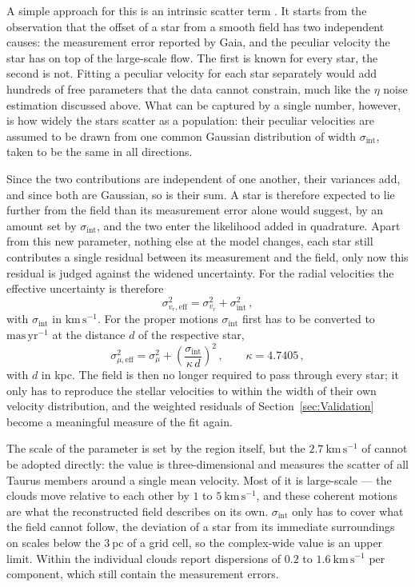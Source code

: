 A simple approach for this is an intrinsic scatter term \citep[Sect.~8]{Hogg2010}. It starts from
the observation that the offset of a star from a smooth field has two independent causes: the
measurement error reported by Gaia, and the peculiar velocity the star has on top of the
large-scale flow. The first is known for every star, the second is not. Fitting a peculiar velocity
for each star separately would add hundreds of free parameters that the data cannot constrain, much
like the $\eta$ noise estimation discussed above. What can be captured by a single number, however,
is how widely the stars scatter as a population: their peculiar velocities are assumed to be drawn
from one common Gaussian distribution of width $\sigma_\mathrm{int}$, taken to be the same in all
directions.

Since the two contributions are independent of one another, their variances add, and since both are
Gaussian, so is their sum. A star is therefore expected to lie further from the field than its
measurement error alone would suggest, by an amount set by $\sigma_\mathrm{int}$, and the two enter
the likelihood added in quadrature. Apart from this new parameter, nothing else at the model changes,
each star still contributes a single residual between its measurement and the field, only now this
residual is judged against the widened uncertainty. For the radial velocities the effective uncertainty
is therefore
\begin{equation}
    \sigma_{v_r,\mathrm{eff}}^2 = \sigma_{v_r}^2 + \sigma_\mathrm{int}^2 \, ,
    \label{eq:sigma_eff_rv}
\end{equation}
with $\sigma_\mathrm{int}$ in $\mathrm{km\,s^{-1}}$. For the proper motions $\sigma_\mathrm{int}$ first
has to be converted to $\mathrm{mas\,yr^{-1}}$ at the distance $d$ of the respective star,
\begin{equation}
    \sigma_{\mu,\mathrm{eff}}^2 = \sigma_{\mu}^2
    + \left( \frac{\sigma_\mathrm{int}}{\kappa\,d} \right)^{2} \, ,
    \qquad \kappa = 4.7405 \, ,
    \label{eq:sigma_eff_pm}
\end{equation}
with $d$ in kpc. The field is then no longer required to pass through every star; it only has to
reproduce the stellar velocities to within the width of their own velocity distribution, and the
weighted residuals of Section~\ref{sec:Validation} become a meaningful measure of the fit again.

The scale of the parameter is set by the region itself, but the $2.7~\mathrm{km\,s^{-1}}$ of
\citet{Galli2019} cannot be adopted directly: the value is three-dimensional and measures the
scatter of all Taurus members around a single mean velocity. Most of it is large-scale --- the
clouds move relative to each other by $1$ to $5~\mathrm{km\,s^{-1}}$, and these coherent motions
are what the reconstructed field describes on its own. $\sigma_\mathrm{int}$ only has to cover what
the field cannot follow, the deviation of a star from its immediate surroundings on scales below
the $3~\mathrm{pc}$ of a grid cell, so the complex-wide value is an upper limit. Within the
individual clouds \citet{Galli2019} report dispersions of $0.2$ to $1.6~\mathrm{km\,s^{-1}}$ per
component, which still contain the measurement errors.

